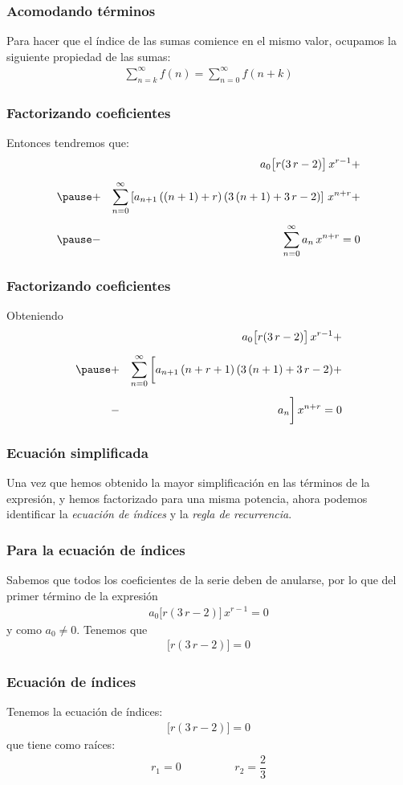 \begin{frame}
\frametitle{Acomodando términos}
Para hacer que el índice de las sumas comience en el mismo valor, ocupamos la siguiente propiedad de las sumas:
\begin{align*}
\sum_{n=k}^{\infty} f(n) = \sum_{n=0}^{\infty} f(n+k)
\end{align*}
\end{frame}
\begin{frame}
\frametitle{Factorizando coeficientes}
Entonces tendremos que:
\begin{eqnarray*}
&{}& a_{0} \big[ r (3 \, r - 2) \big] \, x^{r-1} + \\[0.5em] \pause
&+& \sum_{n=0}^{\infty} \left[  a_{n+1} \, ((n + 1) + r) \, (3 \, (n + 1) + 3 \, r - 2) \right] \, x^{n+r} + \\[0.5em] \pause
&-& \sum_{n=0}^{\infty} a_{n} \, x^{n+r} = 0   
\end{eqnarray*}
\end{frame}
\begin{frame}
\frametitle{Factorizando coeficientes}
Obteniendo
\begin{eqnarray*}
&{}& a_{0} \big[ r (3 \, r - 2) \big] \, x^{r-1} + \\[0.5em] \pause
&+& \sum_{n=0}^{\infty} \bigg[  a_{n+1} \, (n + r + 1) \, (3 \, (n + 1) + 3 \, r - 2) + \\[0.5em]
&-& a_{n} \bigg] \, x^{n+r} = 0
\end{eqnarray*}
\end{frame}
\begin{frame}
\frametitle{Ecuación simplificada}
Una vez que hemos obtenido la mayor simplificación en las términos de la expresión, y hemos factorizado para una misma potencia, ahora podemos identificar la \emph{ecuación de índices} y la \emph{regla de recurrencia}.
\end{frame}
\begin{frame}
\frametitle{Para la ecuación de índices}
Sabemos que todos los coeficientes de la serie deben de anularse, por lo que del primer término de la expresión
\begin{align*}
a_{0} \big[ r (3 \, r - 2) \big] \, x^{r-1} = 0
\end{align*}
y como $a_{0} \neq 0$.
\pause
Tenemos que
\begin{align*}
\big[ r (3 \, r - 2) \big] = 0
\end{align*}
\end{frame}
\begin{frame}
\frametitle{Ecuación de índices}
Tenemos la ecuación de índices:
\begin{align*}
\big[ r (3 \, r - 2) \big] = 0
\end{align*}
\pause
que tiene como raíces:
\begin{align*}
r_{1} = 0 \hspace{2cm} r_{2} = \dfrac{2}{3}
\end{align*}
\end{frame}
